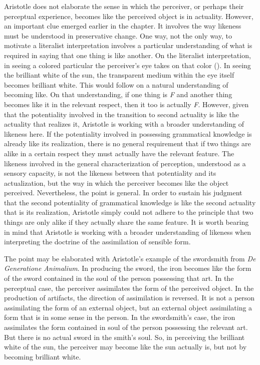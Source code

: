 Aristotle does not elaborate the sense in which the perceiver, or perhaps their perceptual experience, becomes like the perceived object is in actuality. However, an important clue emerged earlier in the chapter. It involves the way likeness must be understood in preservative change. One way, not the only way, to motivate a literalist interpretation involves a particular understanding of what is required in saying that one thing is like another. On the literalist interpretation, in seeing a colored particular the perceiver's eye takes on that color (\citealt{Slakey:1961ss,Sorabji:1974fk,Sorabji:2003fk}). In seeing the brilliant white of the sun, the transparent medium within the eye itself becomes brilliant white. This would follow on a natural understanding of becoming like. On that understanding, if one thing is \emph{F} and another thing becomes like it in the relevant respect, then it too is actually \emph{F}. However, given that the potentiality involved in the transition to second actuality is like the actuality that realizes it, Aristotle is working with a broader understanding of likeness here. If the potentiality involved in possessing grammatical knowledge is already like its realization, there is no general requirement that if two things are alike in a certain respect they must actually have the relevant feature. The likeness involved in the general characterization of perception, understood as a sensory capacity, is not the likeness between that potentiality and its actualization, but the way in which the perceiver becomes like the object perceived. Nevertheless, the point is general. In order to sustain his judgment that the second potentiality of grammatical knowledge is like the second actuality that is its realization, Aristotle simply could not adhere to the principle that two things are only alike if they actually share the same feature. It is worth bearing in mind that Aristotle is working with a broader understanding of likeness when interpreting the doctrine of the assimilation of sensible form.

The point may be elaborated with Aristotle's example of the swordsmith from \emph{De Generatione Animalium}. In producing the sword, the iron becomes like the form of the sword contained in the soul of the person possessing that art. In the perceptual case, the perceiver assimilates the form of the perceived object. In the production of artifacts, the direction of assimilation is reversed. It is not a person assimilating the form of an external object, but an external object assimilating a form that is in some sense in the person. In the swordsmith's case, the iron assimilates the form contained in soul of the person possessing the relevant art. But there is no actual sword in the smith's soul. So, in perceiving the brilliant white of the sun, the perceiver may become like the sun actually is, but not by becoming brilliant white.

